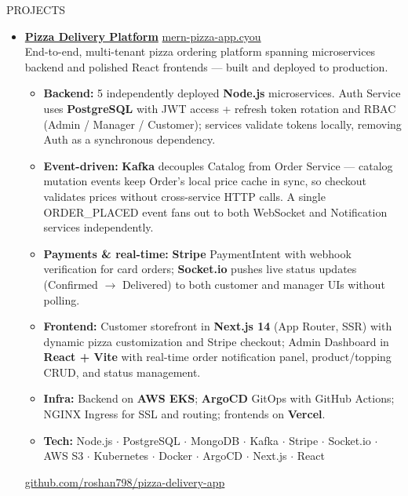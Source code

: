 \documentclass{resume}
\begin{document}
\begin{rSection}{PROJECTS}
\begin{itemize}

\item \href{https://github.com/roshan798/pizza-delivery-app}{\textbf{Pizza Delivery Platform}}
  \hfill \href{https://mern-pizza-app.cyou}{mern-pizza-app.cyou}\\
  End-to-end, multi-tenant pizza ordering platform spanning microservices
  backend and polished React frontends --- built and deployed to production.
  \begin{itemize}
    \itemsep -3pt
    \item \textbf{Backend:} 5 independently deployed \textbf{Node.js} microservices.
          Auth Service uses \textbf{PostgreSQL} with JWT access + refresh token
          rotation and RBAC (Admin / Manager / Customer); services validate tokens
          locally, removing Auth as a synchronous dependency.
    \item \textbf{Event-driven:} \textbf{Kafka} decouples Catalog from Order
          Service --- catalog mutation events keep Order's local price cache
          in sync, so checkout validates prices without cross-service HTTP calls.
          A single ORDER\_PLACED event fans out to both WebSocket and Notification
          services independently.
    \item \textbf{Payments \& real-time:} \textbf{Stripe} PaymentIntent with
          webhook verification for card orders; \textbf{Socket.io} pushes live
          status updates (Confirmed $\to$ Delivered) to both customer and
          manager UIs without polling.
    \item \textbf{Frontend:} Customer storefront in \textbf{Next.js 14}
          (App Router, SSR) with dynamic pizza customization and Stripe checkout;
          Admin Dashboard in \textbf{React + Vite} with real-time order
          notification panel, product/topping CRUD, and status management.
    \item \textbf{Infra:} Backend on \textbf{AWS EKS}; \textbf{ArgoCD} GitOps
          with GitHub Actions; NGINX Ingress for SSL and routing;
          frontends on \textbf{Vercel}.
    \item \textbf{Tech:} Node.js \(\cdot\) PostgreSQL \(\cdot\) MongoDB \(\cdot\)
          Kafka \(\cdot\) Stripe \(\cdot\) Socket.io \(\cdot\) AWS S3 \(\cdot\)
          Kubernetes \(\cdot\) Docker \(\cdot\) ArgoCD \(\cdot\) Next.js \(\cdot\) React
  \end{itemize}
  \href{https://github.com/roshan798/pizza-delivery-app}{github.com/roshan798/pizza-delivery-app}


\end{itemize}
\end{rSection}
\end{document}
